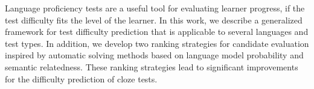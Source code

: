 Language proficiency tests are a useful tool for evaluating learner progress, if the test difficulty fits the level of the learner. In this work, we describe a generalized framework for test difficulty prediction that is applicable to several languages and test types. In addition, we develop two ranking strategies for candidate evaluation inspired by automatic solving methods based on language model probability and semantic relatedness. These ranking strategies lead to significant improvements for the difficulty prediction of cloze tests.
